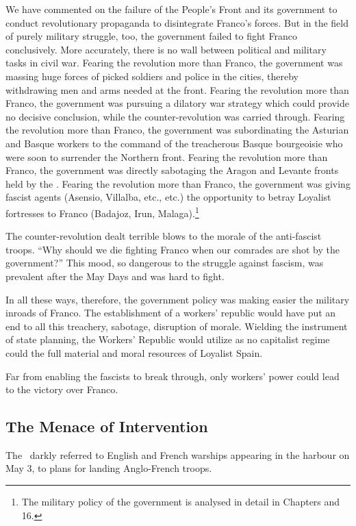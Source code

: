 We have commented on the failure of the People’s Front and its government to conduct revolutionary propaganda to disintegrate Franco’s forces. But in the field of purely military struggle, too, the government failed to fight Franco conclusively. More accurately, there is no wall between political and military tasks in civil war. Fearing the revolution more than Franco, the government was massing huge forces of picked soldiers and police in the cities, thereby withdrawing men and arms needed at the front. Fearing the revolution more than Franco, the government was pursuing a dilatory war strategy which could provide no decisive conclusion, while the counter-revolution was carried through. Fearing the revolution more than Franco, the government was subordinating the Asturian and Basque workers to the command of the treacherous Basque bourgeoisie who were soon to surrender the Northern front. Fearing the revolution more than Franco, the government was directly sabotaging the Aragon and Levante fronts held by the \CNT. Fearing the revolution more than Franco, the government was giving fascist agents (Asensio, Villalba, etc., etc.) the opportunity to betray Loyalist fortresses to Franco (Badajoz, Irun, Malaga).\footnote{The military policy of the government is analysed in detail in Chapters { and 16.}}

The counter-revolution dealt terrible blows to the morale of the anti-fascist troops. ``Why should we die fighting Franco when our comrades are shot by the government?'' This mood, so dangerous to the struggle against fascism, was prevalent after the May Days and was hard to fight.

In all these ways, therefore, the government policy was making easier the military inroads of Franco. The establishment of a workers’ republic would have put an end to all this treachery, sabotage, disruption of morale. Wielding the instrument of state planning, the Workers’ Republic would utilize as no capitalist regime could the full material and moral resources of Loyalist Spain.

Far from enabling the fascists to break through, only workers’ power could lead to the victory over Franco.

\subsection*{The Menace of Intervention}

The \CNT\ darkly referred to English and French warships appearing in the harbour on May 3, to plans for landing Anglo-French troops. 

